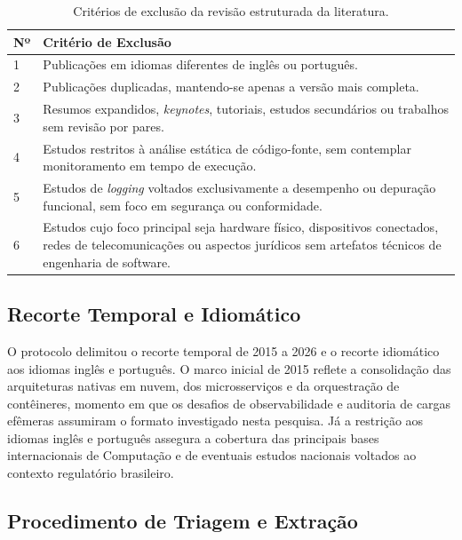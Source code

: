 \begin{table}[!htbp]
    \centering
    \caption{Critérios de exclusão da revisão estruturada da literatura.}
    \label{tab:rsl_criterios_exclusao}
    \small
    \begin{tabular}{p{1.2cm}p{13.2cm}}
        \hline
        \textbf{Nº} & \textbf{Critério de Exclusão} \\ \hline
        1 & Publicações em idiomas diferentes de inglês ou português. \\ \hline
        2 & Publicações duplicadas, mantendo-se apenas a versão mais completa. \\ \hline
        3 & Resumos expandidos, \textit{keynotes}, tutoriais, estudos secundários ou trabalhos sem revisão por pares. \\ \hline
        4 & Estudos restritos à análise estática de código-fonte, sem contemplar monitoramento em tempo de execução. \\ \hline
        5 & Estudos de \textit{logging} voltados exclusivamente a desempenho ou depuração funcional, sem foco em segurança ou conformidade. \\ \hline
        6 & Estudos cujo foco principal seja hardware físico, dispositivos conectados, redes de telecomunicações ou aspectos jurídicos sem artefatos técnicos de engenharia de software. \\ \hline
    \end{tabular}
\end{table}
\FloatBarrier

\subsection{Recorte Temporal e Idiomático}
\label{subsec:rsl_recorte}

O protocolo delimitou o recorte temporal de 2015 a 2026 e o recorte idiomático aos idiomas inglês e português. O marco inicial de 2015 reflete a consolidação das arquiteturas nativas em nuvem, dos microsserviços e da orquestração de contêineres, momento em que os desafios de observabilidade e auditoria de cargas efêmeras assumiram o formato investigado nesta pesquisa. Já a restrição aos idiomas inglês e português assegura a cobertura das principais bases internacionais de Computação e de eventuais estudos nacionais voltados ao contexto regulatório brasileiro.


\subsection{Procedimento de Triagem e Extração}
\label{subsec:rsl_procedimento}

